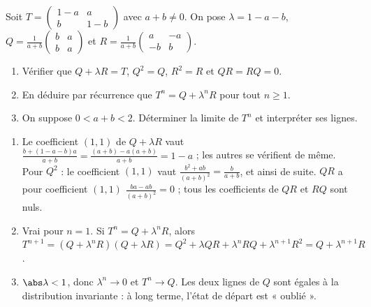 \begin{exercise}
Soit $T=\begin{pmatrix}1-a&a\\b&1-b\end{pmatrix}$ avec $a+b\neq0$. On pose $\lambda=1-a-b$, $Q=\frac1{a+b}\begin{pmatrix}b&a\\b&a\end{pmatrix}$ et $R=\frac1{a+b}\begin{pmatrix}a&-a\\-b&b\end{pmatrix}$.
\begin{enumerate}
\item Vérifier que $Q+\lambda R=T$, $Q^2=Q$, $R^2=R$ et $QR=RQ=0$.
\item En déduire par récurrence que $T^n=Q+\lambda^nR$ pour tout $n\ge1$.
\item On suppose $0<a+b<2$. Déterminer la limite de $T^n$ et interpréter ses lignes.
\end{enumerate}
\end{exercise}
\begin{solution}
\begin{enumerate}
\item Le coefficient $(1,1)$ de $Q+\lambda R$ vaut $\frac{b+(1-a-b)a}{a+b}=\frac{(a+b)-a(a+b)}{a+b}=1-a$ ; les autres se vérifient de même. Pour $Q^2$ : le coefficient $(1,1)$ vaut $\frac{b^2+ab}{(a+b)^2}=\frac b{a+b}$, et ainsi de suite. $QR$ a pour coefficient $(1,1)$ $\frac{ba-ab}{(a+b)^2}=0$ ; tous les coefficients de $QR$ et $RQ$ sont nuls.
\item Vrai pour $n=1$. Si $T^n=Q+\lambda^nR$, alors $T^{n+1}=(Q+\lambda^nR)(Q+\lambda R)=Q^2+\lambda QR+\lambda^nRQ+\lambda^{n+1}R^2=Q+\lambda^{n+1}R$.
\item $\abs\lambda<1$, donc $\lambda^n\to0$ et $T^n\to Q$. Les deux lignes de $Q$ sont égales à la distribution invariante : à long terme, l'état de départ est « oublié ».
\end{enumerate}
\end{solution}

\mxnewpage
